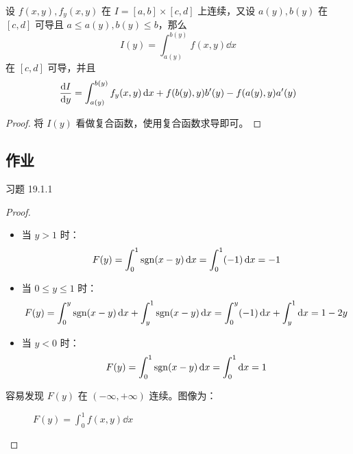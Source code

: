 \begin{theorem}
	设 $f(x, y), f_y(x, y)$ 在 $I = [a, b] \times [c, d]$ 上连续，又设 $a(y), b(y)$ 在 $[c, d]$ 可导且 $a \le a(y), b(y) \le b$，那么
	$$
	I(y) = \int_{a(y)}^{b(y)} f(x, y) \dd{x}
	$$
	在 $[c, d]$ 可导，并且
	$$
	\dv{I}{y} = \int_{a(y)}^{b(y)} f_y(x, y) \dd{x} + f(b(y), y) b'(y) - f(a(y), y) a'(y)
	$$
	\begin{proof}
		将 $I(y)$ 看做复合函数，使用复合函数求导即可。
	\end{proof}
\end{theorem}

\subsection{作业}

\begin{problem}
	习题 19.1.1
	\begin{proof}
		\begin{itemize}
			\item 当 $y > 1$ 时：
			$$
			F(y) = \int_{0}^{1} \operatorname{sgn}(x - y) \dd{x} = \int_{0}^{1} (-1) \dd{x} = -1
			$$
			\item 当 $0 \le y \le 1$ 时：
			$$
			F(y) = \int_{0}^{y} \operatorname{sgn}(x - y) \dd{x} + \int_{y}^{1} \operatorname{sgn}(x - y) \dd{x} = \int_{0}^{y} (-1) \dd{x} + \int_{y}^{1} \dd{x} = 1 - 2y
			$$
			\item 当 $y < 0$ 时：
			$$
			F(y) = \int_{0}^{1} \operatorname{sgn}(x - y) \dd{x} = \int_{0}^{1} \dd{x} = 1
			$$
		\end{itemize}
		容易发现 $F(y)$ 在 $(- \infty, + \infty)$ 连续。图像为：

		\begin{figure}[H]
			\centering
			\caption{$F(y) = \int_{0}^{1} f(x, y) \dd{x}$}
		\end{figure}
	\end{proof}
\end{problem}

